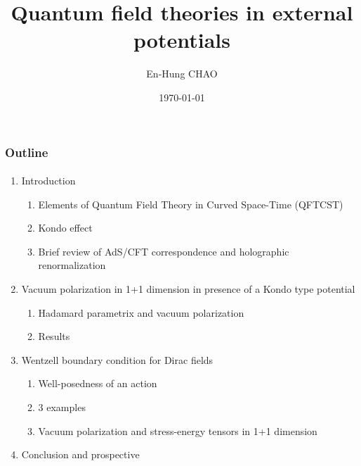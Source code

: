 \documentclass[french]{beamer}
\title{Quantum field theories in external potentials}
\author{En-Hung CHAO}
\institute{Ecole Polytechnique}
\date{\today}
\begin{document}

\begin{frame}
\titlepage%
\end{frame}
\begin{frame}
\frametitle{Outline}
\framesubtitle{}
\begin{enumerate}
 \item Introduction
  \begin{enumerate}
  \item Elements of Quantum Field Theory in Curved Space-Time (QFTCST)
  \item Kondo effect
  \item Brief review of AdS/CFT correspondence and holographic renormalization
  \end{enumerate}
 \item Vacuum polarization in 1+1 dimension in presence of a Kondo type potential
  \begin{enumerate}
  \item Hadamard parametrix and vacuum polarization
  \item Results
  \end{enumerate}
 \item Wentzell boundary condition for Dirac fields
  \begin{enumerate}
  \item Well-posedness of an action
  \item 3 examples
  \item Vacuum polarization and stress-energy tensors in 1+1 dimension
  \end{enumerate}
 \item Conclusion and prospective
\end{enumerate}
\end{frame}
\end{document}
